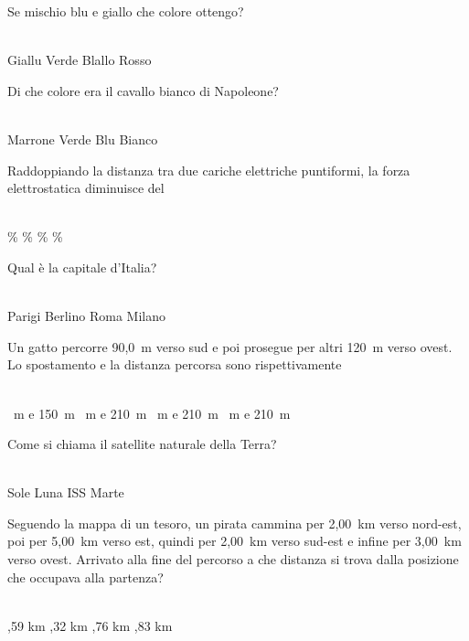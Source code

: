 \documentclass[a4paper,11pt]{exam}
\begin{document}
        \begin{center} 
        \end{center}
\begin{questions}

    
\question Se mischio blu e giallo che colore ottengo?\\\
\begin{oneparchoices}
  \choice Giallu
  \choice Verde
  \choice Blallo
  \choice Rosso
\end{oneparchoices}

    
\question Di che colore era il cavallo bianco di Napoleone?\\\
\begin{oneparchoices}
  \choice Marrone
  \choice Verde
  \choice Blu 
  \choice Bianco
\end{oneparchoices}

    
\question Raddoppiando la distanza tra due cariche elettriche puntiformi, la forza elettrostatica diminuisce del\\\
\begin{oneparchoices}
  \choice 90\%
  \choice 25\%
  \%
  \%
\end{oneparchoices}

    
\question Qual è la capitale d’Italia?\\\
\begin{oneparchoices}
  \choice Parigi
  \choice Berlino
  \choice Roma
  \choice Milano
\end{oneparchoices}

    
\question Un gatto percorre 90,0~m verso sud e poi prosegue per altri 120~m verso ovest. Lo spostamento e la distanza percorsa sono rispettivamente\\\
\begin{oneparchoices}
  \choice 210~m e 150~m
  \choice 150~m e 210~m
  \choice 210~m e 210~m
  \choice 30~m e 210~m
\end{oneparchoices}

    
\question Come si chiama il satellite naturale della Terra?\\\
\begin{oneparchoices}
  \choice Sole
  \choice Luna
  \choice ISS
  \choice Marte
\end{oneparchoices}

    
\question Seguendo la mappa di un tesoro, un pirata cammina per 2,00~km verso nord-est, poi per 5,00~km verso est, quindi per 2,00~km verso sud-est e infine per 3,00~km verso ovest. Arrivato alla fine del percorso a che distanza si trova dalla posizione che occupava alla partenza?\\\
\begin{oneparchoices}
  \choice 4,59 km
  \choice 6,32 km
  ,76 km
  \choice 4,83 km
\end{oneparchoices}


\end{questions}
\end{document}
